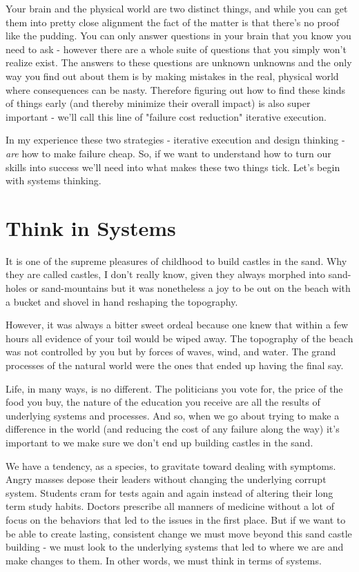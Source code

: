\documentclass[11pt,a5paper]{book}
\begin{document}
Your brain and the physical world are two distinct things, and while you can get them into pretty close alignment the fact of the matter is that there's no proof like the pudding. You can only answer questions in your brain that you know you need to ask - however there are a whole suite of questions that you simply won't realize exist. The answers to these questions are unknown unknowns and the only way you find out about them is by making mistakes in the real, physical world where consequences can be nasty. Therefore figuring out how to find these kinds of things early (and thereby minimize their overall impact) is also super important - we'll call this line of "failure cost reduction" iterative execution.
\newline

In my experience these two strategies - iterative execution and design thinking - \textit{are} how to make failure cheap. So, if we want to understand how to turn our skills into success we'll need into what makes these two things tick. Let's begin with systems thinking.

\section{Think in Systems}
It is one of the supreme pleasures of childhood to build castles in the sand. Why they are called castles, I don't really know, given they always morphed into sand-holes or sand-mountains but it was nonetheless a joy to be out on the beach with a bucket and shovel in hand reshaping the topography. 
\newline

However, it was always a bitter sweet ordeal because one knew that within a few hours all evidence of your toil would be wiped away. The topography of the beach was not controlled by you but by forces of waves, wind, and water. The grand processes of the natural world were the ones that ended up having the final say.
\newline

Life, in many ways, is no different. The politicians you vote for, the price of the food you buy, the nature of the education you receive are all the results of underlying systems and processes. And so, when we go about trying to make a difference in the world (and reducing the cost of any failure along the way) it's important to we make sure we don't end up building castles in the sand. 
\newline

We have a tendency, as a species, to gravitate toward dealing with symptoms. Angry masses depose their leaders without changing the underlying corrupt system. Students cram for tests again and again instead of altering their long term study habits. Doctors prescribe all manners of medicine without a lot of focus on the behaviors that led to the issues in the first place. But if we want to be able to create lasting, consistent change we must move beyond this sand castle building - we must look to the underlying systems that led to where we are and make changes to them. In other words, we must think in terms of systems.
\newline
\end{document}
